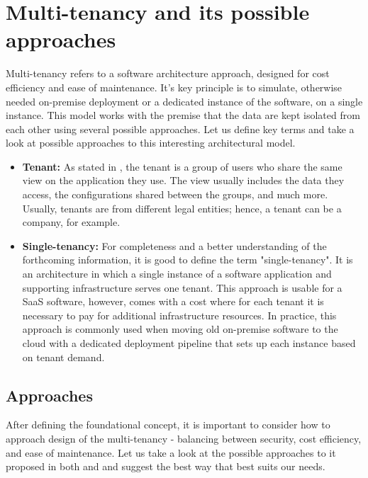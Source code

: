 \section{Multi-tenancy and its possible approaches}
\label{sec:different-approaches-for-multitanency}
Multi-tenancy refers to a software architecture approach, designed for cost efficiency and ease of maintenance.
It's key principle is to simulate, otherwise needed on-premise deployment or a dedicated instance of the software, on a single instance.
This model works with the premise that the data are kept isolated from each other using several possible approaches.
Let us define key terms and take a look at possible approaches to this interesting architectural model.

\begin{itemize}
    \item \textbf{Tenant:} As stated in \cite{MultitennancyArchitecture2012}, the tenant is a group of users who share the same view on the application they use.
    The view usually includes the data they access, the configurations shared between the groups, and much more.
    Usually, tenants are from different legal entities; hence, a tenant can be a company, for example.
    \item \textbf{Single-tenancy:} For completeness and a better understanding of the forthcoming information, it is good to define the term "single-tenancy".
    It is an architecture in which a single instance of a software application and supporting infrastructure serves one tenant.
    This approach is usable for a \ac{SaaS} software, however, comes with a cost where for each tenant it is necessary to pay for additional infrastructure resources.
    In practice, this approach is commonly used when moving old on-premise software to the cloud with a dedicated deployment pipeline that sets up each instance based on tenant demand. 
\end{itemize}


\subsection{Approaches}
After defining the foundational concept, it is important to consider how to approach design of the multi-tenancy - balancing between security, cost efficiency, and ease of maintenance.
Let us take a look at the possible approaches to it proposed in both \cite{MultitennancyArchitecture2012} and \cite{MultitenancyArchitectureMedium} and suggest the best way that best suits our needs.

